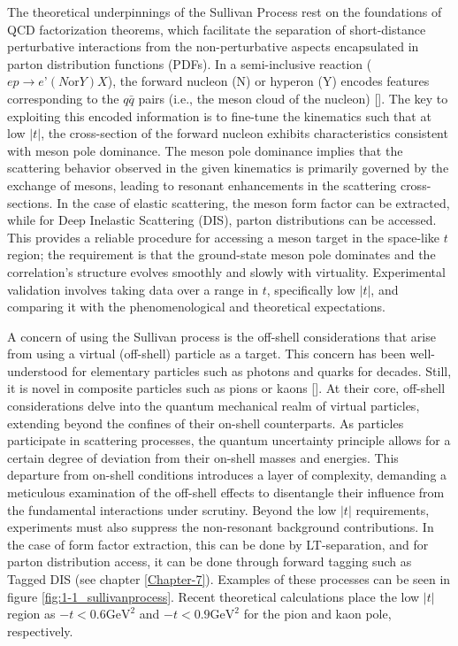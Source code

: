 \documentclass[
]{report}
\begin{document}
The theoretical underpinnings of the Sullivan Process rest on the
foundations of QCD factorization theorems, which facilitate the
separation of short-distance perturbative interactions from the
non-perturbative aspects encapsulated in parton distribution functions
(PDFs). In a semi-inclusive reaction
(\(ep\rightarrow e’(N\mathrm{ or }Y)X\)), the forward nucleon (N) or
hyperon (Y) encodes features corresponding to the \(q\bar{q}\) pairs
(i.e., the meson cloud of the nucleon)
{[}\cite{arrington_revealing_2021}{]}. The key to exploiting this
encoded information is to fine-tune the kinematics such that at low
\(|t|\), the cross-section of the forward nucleon exhibits
characteristics consistent with meson pole dominance. The meson pole
dominance implies that the scattering behavior observed in the given
kinematics is primarily governed by the exchange of mesons, leading to
resonant enhancements in the scattering cross-sections. In the case of
elastic scattering, the meson form factor can be extracted, while for
Deep Inelastic Scattering (DIS), parton distributions can be accessed.
This provides a reliable procedure for accessing a meson target in the
space-like \(t\) region; the requirement is that the ground-state meson
pole dominates and the correlation's structure evolves smoothly and
slowly with virtuality. Experimental validation involves taking data
over a range in \(t\), specifically low \(|t|\), and comparing it with
the phenomenological and theoretical expectations.



A concern of using the Sullivan process is the off-shell considerations
that arise from using a virtual (off-shell) particle as a target. This
concern has been well-understood for elementary particles such as
photons and quarks for decades. Still, it is novel in composite
particles such as pions or kaons {[}\cite{qin_off-shell_2018}{]}. At
their core, off-shell considerations delve into the quantum mechanical
realm of virtual particles, extending beyond the confines of their
on-shell counterparts. As particles participate in scattering processes,
the quantum uncertainty principle allows for a certain degree of
deviation from their on-shell masses and energies. This departure from
on-shell conditions introduces a layer of complexity, demanding a
meticulous examination of the off-shell effects to disentangle their
influence from the fundamental interactions under scrutiny. Beyond the
low \(|t|\) requirements, experiments must also suppress the
non-resonant background contributions. In the case of form factor
extraction, this can be done by LT-separation, and for parton
distribution access, it can be done through forward tagging such as
Tagged DIS (see chapter \ref{Chapter-7}). Examples of these processes
can be seen in figure \ref{fig:1-1_sullivanprocess}. Recent theoretical
calculations place the low \(|t|\) region as \(-t< 0.6 \mathrm{GeV}^2\)
and \(-t< 0.9 \mathrm{GeV}^2\) for the pion and kaon pole, respectively.
\end{document}
